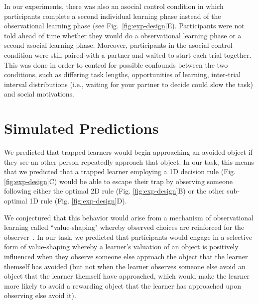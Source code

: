 \documentclass[11pt]{article} %
\begin{document}
In our experiments, there was also an asocial control condition in which participants complete a second individual learning phase instead of the observational learning phase (see Fig.~\ref{fig:exp-design}E). Participants were not told ahead of time whether they would do a observational learning phase or a second asocial learning phase. Moreover, participants in the asocial control condition were still paired with a partner and waited to start each trial together. This was done in order to control for possible confounds between the two conditions, such as differing task lengths, opportunities of learning, inter-trial interval distributions (i.e., waiting for your partner to decide could slow the task) and social motivations.


\section{Simulated Predictions}

We predicted that trapped learners would begin approaching an avoided object if they see an other person repeatedly approach that object. In our task, this means that we predicted that a trapped learner employing a 1D decision rule (Fig. \ref{fig:exp-design}C) would be able to escape their trap by observing someone following either the optimal 2D rule (Fig. \ref{fig:exp-design}B) or the other sub-optimal 1D rule (Fig. \ref{fig:exp-design}D). 

We conjectured that this behavior would arise from a mechanism of observational learning called ``value-shaping" whereby observed choices are reinforced for the observer~\cite{schultnerTransmissionSocialBias2024, najarActionsOthersAct2020}. In our task, we predicted that participants would engage in a selective form of value-shaping whereby a learner's valuation of an object is positively influenced when they observe someone else approach the object that the learner themself has avoided (but not when the learner observes someone else avoid an object that the learner themself have approached, which would make the learner more likely to avoid a rewarding object that the learner has approached upon observing else avoid it). 
\end{document}
